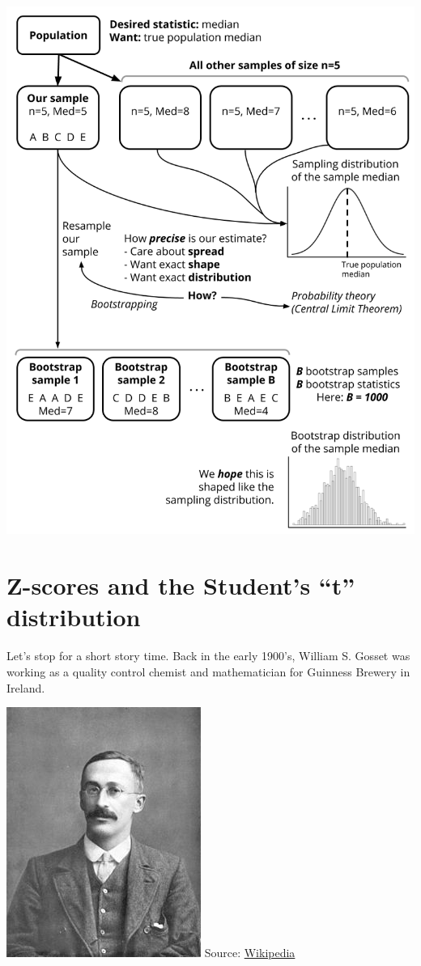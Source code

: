 \documentclass[
]{book}
\begin{document}
\includegraphics{Photos/sampling_variation_flowchart.png}

\hypertarget{z-scores-and-the-students-t-distribution}{%
\section{Z-scores and the Student's ``t'' distribution}\label{z-scores-and-the-students-t-distribution}}

Let's stop for a short story time. Back in the early 1900's, William S. Gosset was working as a quality control chemist and mathematician for Guinness Brewery in Ireland.

\includegraphics{Photos/gosset.jpg}
Source: \href{http://upload.wikimedia.org/wikipedia/commons/thumb/4/42/William_Sealy_Gosset.jpg/240px-William_Sealy_Gosset.jpg}{Wikipedia}
\end{document}
